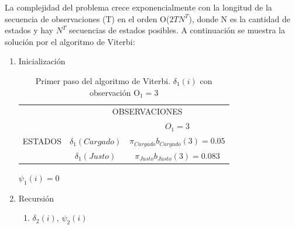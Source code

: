 La complejidad del problema crece exponencialmente con la longitud de la secuencia de observaciones (T) en el orden O($2TN^T$), donde N es la cantidad de estados y hay $N^T$ secuencias de estados posibles. A continuación se muestra la solución por el algoritmo de Viterbi:

\begin{enumerate}
\item Inicialización

\begin{table}[H]
\centering
\begin{tabular}{ccc}
                                              & \multicolumn{2}{c}{OBSERVACIONES}                                                              \\ \cline{2-3} 
\multicolumn{1}{c|}{}                         & \multicolumn{1}{c|}{}                  & \multicolumn{1}{c|}{$O_1=3$}                            \\ \cline{2-3} 
\multicolumn{1}{c|}{ESTADOS} & \multicolumn{1}{c|}{$\delta_1(Cargado)$} & \multicolumn{1}{c|}{$\pi_{Cargado}b_{Cargado}(3)=0.05$} \\ \cline{2-3} 
\multicolumn{1}{c|}{}                         & \multicolumn{1}{c|}{$\delta_1(Justo)$}   & \multicolumn{1}{c|}{$\pi_{Justo}b_{Justo}(3)=0.083$}    \\ \cline{2-3} 
\end{tabular}
\caption{Primer paso del algoritmo de Viterbi. $\delta_1(i)$ con observación O$_1=3$}
\label{tbl:viterbi1}
\end{table}

$\psi_1(i) = 0$

\item Recursión
\begin{enumerate}
    \item $\delta_2(i)$, $\psi_2(i)$


\end{enumerate}
\end{enumerate}
